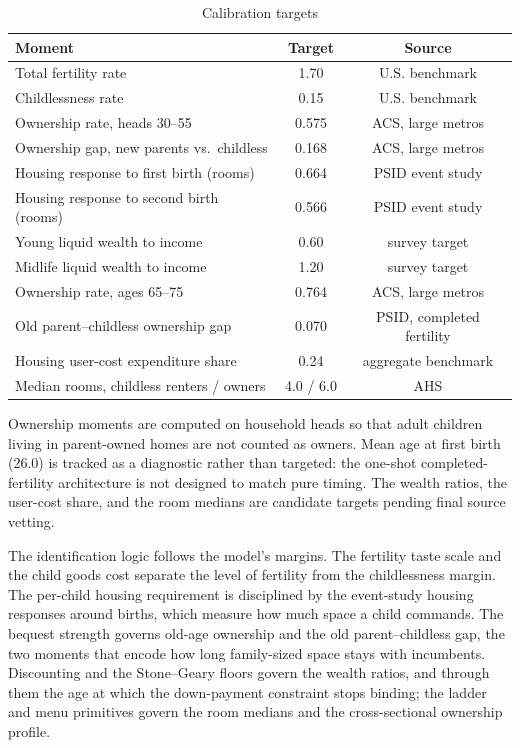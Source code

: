 \documentclass[11pt]{article}
\newcommand{\1}{\mathbf 1}
\begin{document}
\begin{table}[H]
\centering
\caption{Calibration targets}
\label{tab:targets}
\begin{tabular}{lcc}
\toprule
Moment & Target & Source \\
\midrule
Total fertility rate & 1.70 & U.S. benchmark \\
Childlessness rate & 0.15 & U.S. benchmark \\
Ownership rate, heads 30--55 & 0.575 & ACS, large metros \\
Ownership gap, new parents vs.\ childless & 0.168 & ACS, large metros \\
Housing response to first birth (rooms) & 0.664 & PSID event study \\
Housing response to second birth (rooms) & 0.566 & PSID event study \\
Young liquid wealth to income & 0.60 & survey target \\
Midlife liquid wealth to income & 1.20 & survey target \\
Ownership rate, ages 65--75 & 0.764 & ACS, large metros \\
Old parent--childless ownership gap & 0.070 & PSID, completed fertility \\
Housing user-cost expenditure share & 0.24 & aggregate benchmark \\
Median rooms, childless renters / owners & 4.0 / 6.0 & AHS \\
\bottomrule
\end{tabular}
\par\smallskip
\parbox{0.92\textwidth}{\footnotesize Ownership moments are computed on household heads so that adult children living in parent-owned homes are not counted as owners. Mean age at first birth (26.0) is tracked as a diagnostic rather than targeted: the one-shot completed-fertility architecture is not designed to match pure timing. The wealth ratios, the user-cost share, and the room medians are candidate targets pending final source vetting.}
\end{table}

The identification logic follows the model's margins. The fertility taste scale and the child goods cost separate the level of fertility from the childlessness margin. The per-child housing requirement is disciplined by the event-study housing responses around births, which measure how much space a child commands. The bequest strength governs old-age ownership and the old parent--childless gap, the two moments that encode how long family-sized space stays with incumbents. Discounting and the Stone--Geary floors govern the wealth ratios, and through them the age at which the down-payment constraint stops binding; the ladder and menu primitives govern the room medians and the cross-sectional ownership profile.
\end{document}
